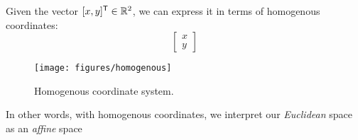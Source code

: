 Given the vector $[x, y]^{\mathsf{T}} \in \mathbb{R}^2$, we can express it in terms of homogenous coordinates: 
\begin{equation}
    \begin{bmatrix}
        x \\ y
    \end{bmatrix}
\end{equation}

\begin{figure}[H]
    \centering
    \texttt{[image: figures/homogenous]}
    \caption{Homogenous coordinate system.}
\end{figure}

In other words, with homogenous coordinates, we interpret our \emph{Euclidean} space as an \emph{affine} space
